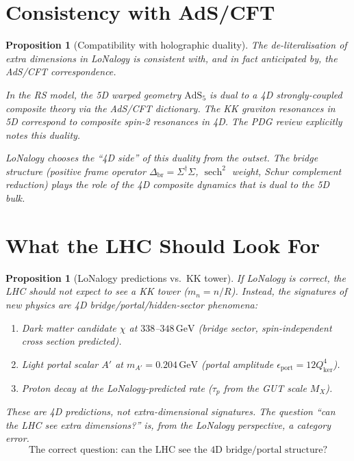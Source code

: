 \documentclass[12pt]{article}
\theoremstyle{plain}
\newtheorem{proposition}[theorem]{Proposition}
\theoremstyle{definition}
\numberwithin{equation}{section}
\newcommand{\br}{\mathrm{br}}
\DeclareMathOperator{\sech}{sech}
\begin{document}
\section{Consistency with AdS/CFT}\label{sec:adscft}

\begin{proposition}[Compatibility with holographic duality]\label{prop:adscft}
The de-literalisation of extra dimensions in LoNalogy is consistent
with, and in fact anticipated by, the AdS/CFT correspondence.

In the RS model, the 5D warped geometry $\mathrm{AdS}_5$ is dual to
a 4D strongly-coupled composite theory via the AdS/CFT dictionary.
The KK graviton resonances in 5D correspond to composite spin-2
resonances in 4D.  The PDG review explicitly notes this duality.

LoNalogy chooses the ``4D side'' of this duality from the outset.
The bridge structure (positive frame operator
$\Delta_{\br}=\Sigma^\dagger\Sigma$, $\sech^2$ weight,
Schur complement reduction) plays the role of the 4D composite
dynamics that is dual to the 5D bulk.
\end{proposition}


\section{What the LHC Should Look For}\label{sec:lhc}

\begin{proposition}[LoNalogy predictions vs.\ KK tower]\label{prop:lhc}
If LoNalogy is correct, the LHC should not expect to see a KK tower
($m_n=n/R$).  Instead, the signatures of new physics are 4D
bridge/portal/hidden-sector phenomena:
\begin{enumerate}[label=(\roman*)]
\item Dark matter candidate $\chi$ at $338$--$348\,\mathrm{GeV}$
(bridge sector, spin-independent cross section predicted).
\item Light portal scalar $A'$ at $m_{A'}=0.204\,\mathrm{GeV}$
(portal amplitude $\epsilon_{\mathrm{port}}=12Q_{\mathrm{ker}}^4$).
\item Proton decay at the LoNalogy-predicted rate
($\tau_p$ from the GUT scale $M_X$).
\end{enumerate}
These are 4D predictions, not extra-dimensional signatures.
The question ``can the LHC see extra dimensions?'' is, from the
LoNalogy perspective, a category error.
\begin{equation}
\boxed{\text{The correct question: can the LHC see the 4D
bridge/portal structure?}}
\end{equation}
\end{proposition}
\end{document}
